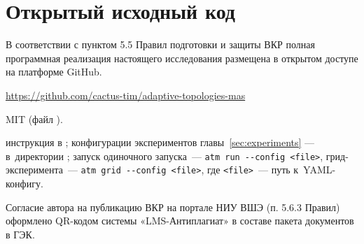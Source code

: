 
\clearpage
\section{Открытый исходный код}
\label{app:github}

В соответствии с пунктом 5.5 Правил подготовки и защиты ВКР
полная программная реализация настоящего исследования размещена
в открытом доступе на платформе GitHub.

\begin{description}[leftmargin=2em, itemsep=0.3em, style=nextline]
\item[\textbf{Адрес репозитория}]
   \url{https://github.com/cactus-tim/adaptive-topologies-mas}
\item[\textbf{Лицензия}] MIT (файл ).
\item[\textbf{Сборка и воспроизведение}]
   инструкция в ; конфигурации экспериментов
   главы~\ref{sec:experiments} --- в~директории ;
   запуск одиночного запуска~--- \texttt{atm run -{}-config <file>},
   грид-эксперимента~--- \texttt{atm grid -{}-config <file>}, где
   \texttt{<file>}~--- путь к~YAML-конфигу.
\end{description}

Согласие автора на публикацию ВКР на портале НИУ ВШЭ (п. 5.6.3
Правил) оформлено QR-кодом системы «LMS-Антиплагиат» в составе
пакета документов в ГЭК.

